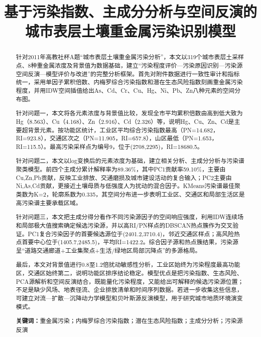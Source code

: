 \documentclass[UTF8,a4paper,12pt]{ctexart}
\title{\heiti\zihao{2} 基于污染指数、主成分分析与空间反演的城市表层土壤重金属污染识别模型}
\author{}
\date{}
\begin{document}
\maketitle

\begin{abstract}
针对2011年高教社杯A题“城市表层土壤重金属污染分析”，本文以319个城市表层土采样点、8种重金属浓度及背景值为数据基础，建立“污染程度评价—污染原因识别—污染源空间反演—模型评价与改进”的完整分析框架。首先对附件数据进行一致性审计和指标统一，采用单因子累积倍数、内梅罗综合污染指数和潜在生态风险指数刻画重金属污染程度，并用IDW空间插值给出As、Cd、Cr、Cu、Hg、Ni、Pb、Zn八种元素的空间分布图。

针对问题一，本文将各元素浓度与背景值比较，发现全市平均累积倍数由高到低大致为Hg（8.563）、Cu（4.168）、Zn（2.916）、Cd（2.326）等，说明Hg、Cu、Zn、Cd是主要超背景元素。按功能区统计，工业区平均综合污染指数最高（PN=14.682，RI=923.8），交通区次之（PN=11.905，RI=657.8），山区最低（PN=1.653，RI=115.5）。最高污染采样点为编号9，位于(2708,2295)，RI=18680.5。

针对问题二，本文以log变换后的元素浓度为基础，建立相关分析、主成分分析与污染谱聚类模型。前四个主成分累计解释率为89.36\%，其中PC1贡献率59.10\%，主要由Cu,Zn,Pb贡献，反映工业排放、交通磨损及城市建设活动的复合输入；PC2主要由Ni,As,Cd贡献，更接近土壤母质与低强度人为扰动的混合因子。KMeans污染谱最佳聚类数为K=2，轮廓系数为0.335，其空间分布进一步表明工业区、交通区和局部生活区是高污染谱主要承载区域。

针对问题三，本文把主成分得分看作不同污染源因子的空间响应强度，利用IDW连续场和局部极大值搜索确定候选污染源，并以高RI/PN样点的DBSCAN热点簇作为交叉验证。PC1复合污染因子的首要候选源位于(2401.2,3710.4)，邻近交通区样点；高风险热点首要中心位于(1405.7,2485.5)，平均RI=1422.2。综合因子源和热点簇结果，污染源呈“道路交通廊道+工业集聚点+生活/绿地区局部沉降点”的多源格局。

最后，本文对背景值进行0.8至1.2倍扰动敏感性分析，工业区始终为污染程度最高功能区，交通区始终第二，说明功能区排序结论稳定。模型优点是把污染指数、生态风险、PCA源解析和空间反演结合，既能量化污染程度，又能给出可解释的候选污染源位置；不足是缺少风场、地表径流、企业排放清单和时间序列数据。若进一步收集这些信息，可建立对流—扩散—沉降动力学模型和贝叶斯源反演模型，用于研究城市地质环境演变模式。

\textbf{关键词：}重金属污染；内梅罗综合污染指数；潜在生态风险指数；主成分分析；污染源反演
\end{abstract}

\newpage
\tableofcontents
\newpage
\end{document}
